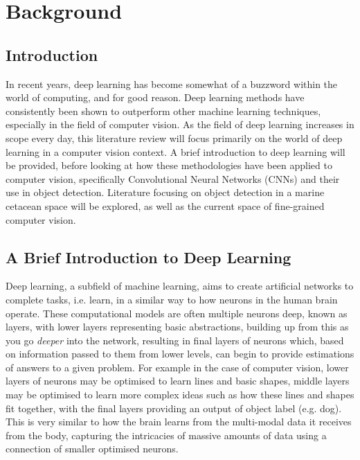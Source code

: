 \chapter{Background}\label{ch:Background}

\section{Introduction}\label{ch:Background,sec:Intro}

In recent years, deep learning has become somewhat of a buzzword within the world of computing, and for good reason. Deep learning methods have consistently been shown to outperform other machine learning techniques, especially in the field of computer vision. As the field of deep learning increases in scope every day, this literature review will focus primarily on the world of deep learning in a computer vision context. A brief introduction to deep learning will be provided, before looking at how these methodologies have been applied to computer vision, specifically Convolutional Neural Networks (CNNs) and their use in object detection. Literature focusing on object detection in a marine cetacean space will be explored, as well as the current space of fine-grained computer vision. 

\section{A Brief Introduction to Deep Learning}\label{ch:Background,sec:DLIntro}

Deep learning, a subfield of machine learning, aims to create artificial networks to complete tasks, i.e. learn, in a similar way to how neurons in the human brain operate. These computational models are often multiple neurons deep, known as layers, with lower layers representing basic abstractions, building up from this as you go \textit{deeper} into the network, resulting in final layers of neurons which, based on information passed to them from lower levels, can begin to provide estimations of answers to a given problem. For example in the case of computer vision, lower layers of neurons may be optimised to learn lines and basic shapes, middle layers may be optimised to learn more complex ideas such as how these lines and shapes fit together, with the final layers providing an output of object label (e.g. dog). This is very similar to how the brain learns from the multi-modal data it receives from the body, capturing the intricacies of massive amounts of data using a connection of smaller optimised neurons. 

